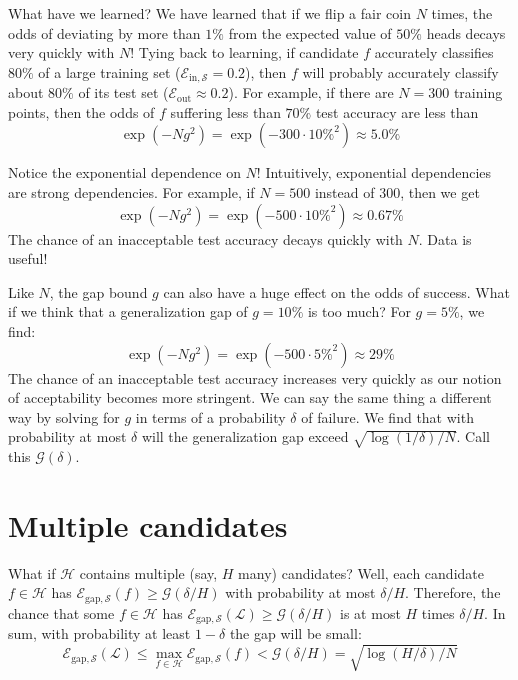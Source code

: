 \documentclass[openany, notitlepage, justified]{tufte-book}
\newcommand{\Ee}{\mathcal{E}}
\newcommand{\Gg}{\mathcal{G}}
\newcommand{\Hh}{\mathcal{H}}
\newcommand{\Ll}{\mathcal{L}}
\newcommand{\Ss}{\mathcal{S}}
\newcommand{\Ein}{\Ee_{\text{in},\Ss}}
\newcommand{\Eout}{\Ee_{\text{out}}}
\begin{document}
            What have we learned?  We have learned that if we flip a fair coin
            $N$ times, the odds of deviating by more than $1\%$ from the
            expected value of $50\%$ heads decays very quickly with $N$!  Tying
            back to learning, if candidate $f$ accurately classifies
            $80\%$ of a large training set ($\Ein=0.2$), then $f$
            will probably accurately classify about $80\%$ of its test set
            ($\Eout\approx 0.2$).  For example, if there are $N=300$
            training points, then the odds of $f$ suffering less than $70\%$
            test accuracy are less than
            $$
                \exp(-Ng^2) = \exp(-300 \cdot 10\%^2) \approx 5.0\%
            $$

            Notice the exponential dependence on $N$!  Intuitively, exponential
            dependencies are strong dependencies.  For example, if $N=500$ instead
            of $300$, then we get
            $$
                \exp(-Ng^2) = \exp(-500 \cdot 10\%^2) \approx 0.67\%
            $$
            The chance of an inacceptable test accuracy decays
            quickly with $N$.  Data is useful!

            Like $N$, the gap bound $g$ can also have a huge effect on the
            odds of success.
            What if we think that a
            generalization gap of $g=10\%$ is too much?
            For $g=5\%$, we find:
            $$
                \exp(-Ng^2) = \exp(-500 \cdot 5\%^2) \approx 29\%
            $$
            The chance of an inacceptable test accuracy increases very quickly
            as our notion of acceptability becomes more stringent.
            We can say the same thing a different way by solving for $g$
            in terms of a probability $\delta$ of failure.
            We find that with probability at most $\delta$ will the
            generalization gap exceed $\sqrt{\log(1/\delta)/N}$.  Call this
            $\Gg(\delta)$.
  
        \section{Multiple candidates}
            What if $\Hh$ contains multiple (say, $H$ many) candidates?
            Well, each candidate $f\in \Hh$ has
            $
                \Ee_{\text{gap},\Ss}(f) \geq \Gg(\delta/H)
            $
            with probability at most $\delta/H$.  Therefore, the chance
            that some $f\in \Hh$ has
            $
                \Ee_{\text{gap},\Ss}(\Ll) \geq \Gg(\delta/H)
            $
            is at most $H$ times $\delta/H$.  In sum,
            with probability at least $1-\delta$ the gap will be small:
            $$
                \Ee_{\text{gap},\Ss}(\Ll)
                    \leq \max_{f\in\Hh} \Ee_{\text{gap}, \Ss}(f)
                    < \Gg(\delta/H)
                    = \sqrt{\log(H/\delta)/N}
            $$
\end{document}
